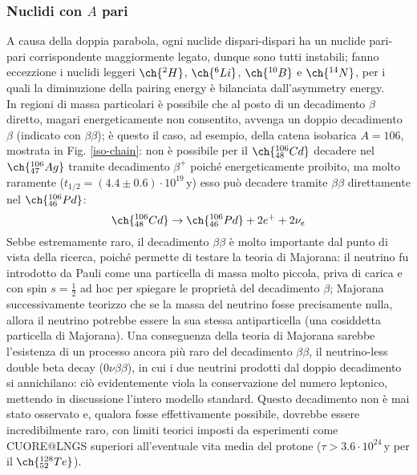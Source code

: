 \subsubsection{Nuclidi con \texorpdfstring{$ A $}{TEXT} pari}

A causa della doppia parabola, ogni nuclide dispari-dispari ha un nuclide pari-pari corrispondente maggiormente legato, dunque sono tutti instabili; fanno eccezzione i nuclidi leggeri $ \ch{^2 H} $, $ \ch{^6 Li} $, $ \ch{^{10} B} $ e $ \ch{^{14} N} $, per i quali la diminuzione della pairing energy è bilanciata dall'asymmetry energy.\\
In regioni di massa particolari è possibile che al posto di un decadimento $ \beta $ diretto, magari energeticamente non consentito, avvenga un doppio decadimento $ \beta $ (indicato con $ \beta\beta $); è questo il caso, ad esempio, della catena isobarica $ A = 106 $, mostrata in Fig. \ref{iso-chain}: non è possibile per il $ \ch{^{106}_{48} Cd} $ decadere nel $ \ch{^{106}_{47} Ag} $ tramite decadimento $ \beta^+ $ poiché energeticamente proibito, ma molto raramente ($ t_{1/2} = (4.4 \pm 0.6) \cdot 10^{19} \,\text{y} $) esso può decadere tramite $ \beta\beta $ direttamente nel $ \ch{^{106}_{46} Pd} $:
\begin{equation*}
	\ch{^{106}_{48} Cd} \rightarrow \ch{^{106}_{46} Pd} + 2e^+ + 2\nu_e
\end{equation*}
Sebbe estremamente raro, il decadimento $ \beta\beta $ è molto importante dal punto di vista della ricerca, poiché permette di testare la teoria di Majorana: il neutrino fu introdotto da Pauli come una particella di massa molto piccola, priva di carica e con spin $ s = \frac{1}{2} $ ad hoc per spiegare le proprietà del decadimento $ \beta $; Majorana successivamente teorizzo che se la massa del neutrino fosse precisamente nulla, allora il neutrino potrebbe essere la sua stessa antiparticella (una cosiddetta particella di Majorana). Una conseguenza della teoria di Majorana sarebbe l'esistenza di un processo ancora più raro del decadimento $ \beta\beta $, il neutrino-less double beta decay ($ 0\nu\beta\beta $), in cui i due neutrini prodotti dal doppio decadimento si annichilano: ciò evidentemente viola la conservazione del numero leptonico, mettendo in discussione l'intero modello standard. Questo decadimento non è mai stato osservato e, qualora fosse effettivamente possibile, dovrebbe essere incredibilmente raro, con limiti teorici imposti da esperimenti come CUORE@LNGS superiori all'eventuale vita media del protone ($ \tau > 3.6 \cdot 10^{24} \,\text{y} $ per il $ \ch{^{128}_{52} Te} $).

